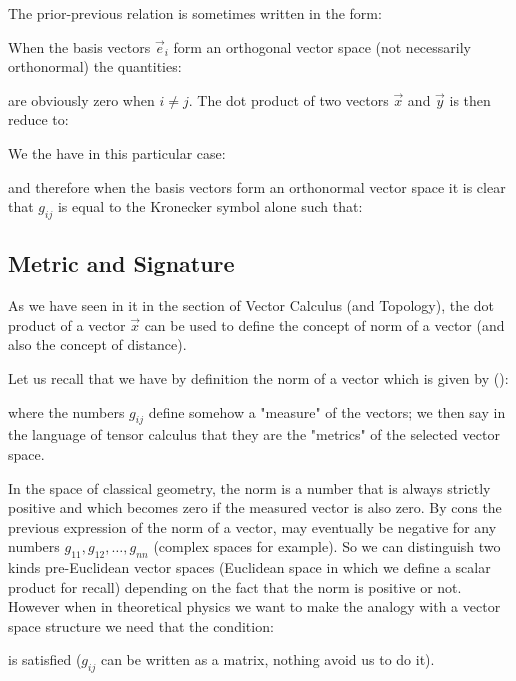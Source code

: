 	The prior-previous relation is sometimes written in the form:
	
	\begin{tcolorbox}[title=Remark,colframe=black,arc=10pt]
	When the basis vectors $\vec{e}_i$ form an orthogonal vector space (not necessarily orthonormal) the quantities:
	
	are obviously zero when $i \neq j$. The dot product of two vectors $\vec{x}$ and $\vec{y}$ is then reduce to:
	
	We the have in this particular case\label{condensed flat metric space notation}:
	
	and therefore when the basis vectors form an orthonormal vector space it is clear that $g_{ij}$ is equal to the Kronecker symbol alone such that:
	
	\end{tcolorbox}
	
	\subsection{Metric and Signature}
	As we have seen in it in the section of Vector Calculus (and Topology), the dot product of a vector $\vec{x}$ can be used to define the concept of norm of a vector (and also the concept of distance).
	
	Let us recall that we have by definition the norm of a vector which is given by ()\label{norm tensor notation}:
	
	where the numbers $g_{ij}$ define somehow a "measure" of the vectors; we then say in the language of tensor calculus that they are the "metrics" of the selected vector space.
	
	In the space of classical geometry, the norm is a number that is always strictly positive and which becomes zero if the measured vector is also zero. By cons the previous expression of the norm of a vector, may eventually be negative for any numbers $g_{11},g_{12},\ldots,g_{nn}$ (complex spaces for example). So we can distinguish two kinds pre-Euclidean vector spaces\label{pre euclidean vector space} (Euclidean space in which we define a scalar product for recall) depending on the fact that the norm is positive or not. However when in theoretical physics we want to make the analogy with a vector space structure we need that the condition:
	
	is satisfied ($g_{ij}$ can be written as a matrix, nothing avoid us to do it).
	
